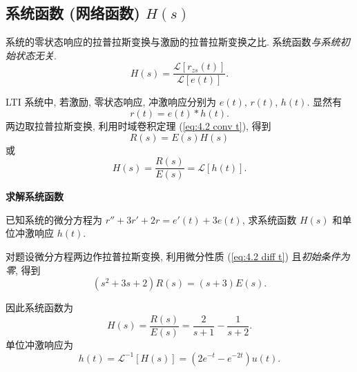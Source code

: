 \subsection{系统函数 (网络函数) \texorpdfstring{$H(s)$}{H(s)}} \label{4 系统函数 (网络函数) H(s)}
系统的零状态响应的拉普拉斯变换与激励的拉普拉斯变换之比. 系统函数\textit{与系统初始状态无关}.
\begin{equation}
    H(s)=\frac{\mathcal{L}[r_{zs}(t)]}{\mathcal{L}[e(t)]}.
\end{equation}

LTI 系统中, 若激励, 零状态响应, 冲激响应分别为 $e(t)$, $r(t)$, $h(t)$. 显然有
\begin{equation}
    r(t)=e(t)*h(t).
\end{equation}
两边取拉普拉斯变换, 利用时域卷积定理 (\ref{eq:4.2 conv t}), 得到
\begin{equation*}
    R(s)=E(s)H(s)
\end{equation*}
或
\begin{equation}
    H(s)=\frac{R(s)}{E(s)}=\mathcal{L}[h(t)].
\end{equation}

\textbf{求解系统函数}
\begin{exampleprob}
    已知系统的微分方程为 $r''+3r'+2r=e'(t)+3e(t)$, 求系统函数 $H(s)$ 和单位冲激响应 $h(t)$.

    \begin{solution}
        对题设微分方程两边作拉普拉斯变换, 利用微分性质 (\ref{eq:4.2 diff t}) 且\textit{初始条件为零}, 得到
        \begin{equation*}
            (s^2+3s+2)R(s)=(s+3)E(s).
        \end{equation*}

        因此系统函数为
        \begin{equation*}
            H(s)=\frac{R(s)}{E(s)}=\frac{2}{s+1}-\frac{1}{s+2}.
        \end{equation*}
        单位冲激响应为
        \begin{equation}
            h(t)=\mathcal{L}^{-1}[H(s)]=(2e^{-t}-e^{-2t})u(t).
        \end{equation}
    \end{solution}
\end{exampleprob}


